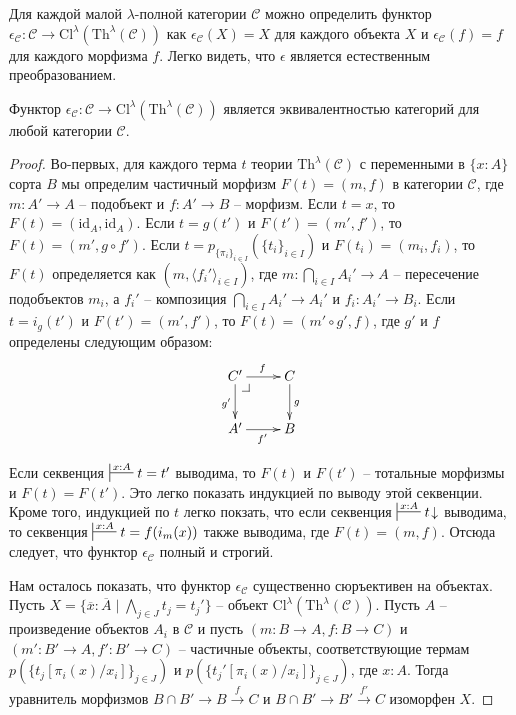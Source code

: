 \documentclass[reqno]{amsart}
\makeatletter
\theoremstyle{definition}
\theoremstyle{remark}
\newcommand{\cat}[1]{\mathcal{#1}}
\newcommand{\fs}[1]{\mathrm{#1}}
\newcommand{\pb}[1][dr]{\save*!/#1-1.2pc/#1:(-1,1)@^{|-}\restore}
\makeatother
\begin{document}
Для каждой малой $\lambda$-полной категории $\cat{C}$ можно определить функтор $\epsilon_\cat{C} : \cat{C} \to \fs{Cl}^\lambda(\fs{Th}^\lambda(\cat{C}))$
как $\epsilon_\cat{C}(X) = X$ для каждого объекта $X$ и $\epsilon_\cat{C}(f) = f$ для каждого морфизма $f$.
Легко видеть, что $\epsilon$ является естественным преобразованием.

\begin{prop}[cl-th]
Функтор $\epsilon_\cat{C} : \cat{C} \to \fs{Cl}^\lambda(\fs{Th}^\lambda(\cat{C}))$ является эквивалентностью категорий для любой категории $\cat{C}$.
\end{prop}
\begin{proof}
Во-первых, для каждого терма $t$ теории $\fs{Th}^\lambda(\cat{C})$ с переменными в $\{ x : A \}$ сорта $B$ мы определим частичный морфизм $F(t) = (m,f)$ в категории $\cat{C}$, где $m : A' \to A$ -- подобъект и $f : A' \to B$ -- морфизм.
Если $t = x$, то $F(t) = (\fs{id}_A,\fs{id}_A)$.
Если $t = g(t')$ и $F(t') = (m',f')$, то $F(t) = (m', g \circ f')$.
Если $t = p_{\{ \pi_i \}_{i \in I}}(\{ t_i \}_{i \in I})$ и $F(t_i) = (m_i,f_i)$, то $F(t)$ определяется как $(m, \langle f_i' \rangle_{i \in I})$,
где $m : \bigcap_{i \in I} A_i' \to A$ -- пересечение подобъектов $m_i$, а $f_i'$ -- композиция $\bigcap_{i \in I} A_i' \to A_i'$ и $f_i : A_i' \to B_i$.
Если $t = i_g(t')$ и $F(t') = (m',f')$, то $F(t) = (m' \circ g', f)$, где $g'$ и $f$ определены следующим образом:
\[ \xymatrix{ C' \ar[r]^f \ar[d]_{g'} \pb & C \ar[d]^g \\
              A' \ar[r]_{f'}              & B
            } \]

Если секвенция $\sststile{}{x : A} t = t'$ выводима, то $F(t)$ и $F(t')$ -- тотальные морфизмы и $F(t) = F(t')$.
Это легко показать индукцией по выводу этой секвенции.
Кроме того, индукцией по $t$ легко покзать, что если секвенция $\sststile{}{x : A} t\!\downarrow$ выводима, то секвенция $\sststile{}{x : A} t = f(i_m(x))$ также выводима, где $F(t) = (m,f)$.
Отсюда следует, что функтор $\epsilon_\cat{C}$ полный и строгий.

Нам осталось показать, что функтор $\epsilon_\cat{C}$ существенно сюръективен на объектах.
Пусть $X = \{ \overline{x} : \overline{A} \mid \bigwedge_{j \in J} t_j = t_j' \}$ -- объект $\fs{Cl}^\lambda(\fs{Th}^\lambda(\cat{C}))$.
Пусть $A$ -- произведение объектов $A_i$ в $\cat{C}$ и пусть $(m : B \to A, f : B \to C)$ и $(m' : B' \to A, f' : B' \to C)$ -- частичные объекты,
соответствующие термам $p(\{ t_j[\pi_i(x)/x_i] \}_{j \in J})$ и $p(\{ t_j'[\pi_i(x)/x_i] \}_{j \in J})$, где $x : A$.
Тогда уравнитель морфизмов $B \cap B' \to B \xrightarrow{f} C$ и $B \cap B' \to B' \xrightarrow{f'} C$ изоморфен $X$.
\end{proof}
\end{document}

